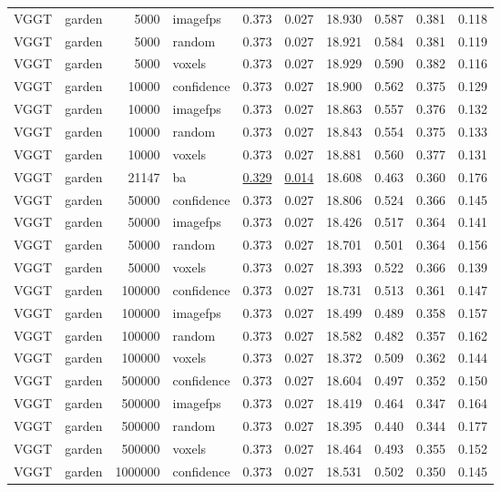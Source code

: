 \begin{table}[H]
\begin{tabular}{llrlrrrrrr}
VGGT & garden & 5000 & imagefps & 0.373 & 0.027 & 18.930 & 0.587 & 0.381 & 0.118 \\
VGGT & garden & 5000 & random & 0.373 & 0.027 & 18.921 & 0.584 & 0.381 & 0.119 \\
VGGT & garden & 5000 & voxels & 0.373 & 0.027 & 18.929 & 0.590 & 0.382 & 0.116 \\
VGGT & garden & 10000 & confidence & 0.373 & 0.027 & 18.900 & 0.562 & 0.375 & 0.129 \\
VGGT & garden & 10000 & imagefps & 0.373 & 0.027 & 18.863 & 0.557 & 0.376 & 0.132 \\
VGGT & garden & 10000 & random & 0.373 & 0.027 & 18.843 & 0.554 & 0.375 & 0.133 \\
VGGT & garden & 10000 & voxels & 0.373 & 0.027 & 18.881 & 0.560 & 0.377 & 0.131 \\
VGGT & garden & 21147 & ba & \underline{0.329} & \underline{0.014} & 18.608 & 0.463 & 0.360 & 0.176 \\
VGGT & garden & 50000 & confidence & 0.373 & 0.027 & 18.806 & 0.524 & 0.366 & 0.145 \\
VGGT & garden & 50000 & imagefps & 0.373 & 0.027 & 18.426 & 0.517 & 0.364 & 0.141 \\
VGGT & garden & 50000 & random & 0.373 & 0.027 & 18.701 & 0.501 & 0.364 & 0.156 \\
VGGT & garden & 50000 & voxels & 0.373 & 0.027 & 18.393 & 0.522 & 0.366 & 0.139 \\
VGGT & garden & 100000 & confidence & 0.373 & 0.027 & 18.731 & 0.513 & 0.361 & 0.147 \\
VGGT & garden & 100000 & imagefps & 0.373 & 0.027 & 18.499 & 0.489 & 0.358 & 0.157 \\
VGGT & garden & 100000 & random & 0.373 & 0.027 & 18.582 & 0.482 & 0.357 & 0.162 \\
VGGT & garden & 100000 & voxels & 0.373 & 0.027 & 18.372 & 0.509 & 0.362 & 0.144 \\
VGGT & garden & 500000 & confidence & 0.373 & 0.027 & 18.604 & 0.497 & 0.352 & 0.150 \\
VGGT & garden & 500000 & imagefps & 0.373 & 0.027 & 18.419 & 0.464 & 0.347 & 0.164 \\
VGGT & garden & 500000 & random & 0.373 & 0.027 & 18.395 & 0.440 & 0.344 & 0.177 \\
VGGT & garden & 500000 & voxels & 0.373 & 0.027 & 18.464 & 0.493 & 0.355 & 0.152 \\
VGGT & garden & 1000000 & confidence & 0.373 & 0.027 & 18.531 & 0.502 & 0.350 & 0.145 \\

\end{tabular}
\end{table}
